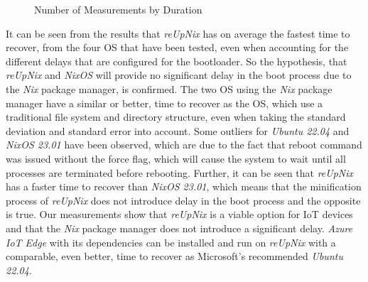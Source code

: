 \begin{figure}[H]
\caption{Number of Measurements by Duration}
\label{fig:timetorecover}
\end{figure}
\noindent
It can be seen from the results that \textit{reUpNix} has on average the fastest time
to recover, from the four \ac{OS} that have been tested, even when accounting for the different
delays that are configured for the bootloader. So the hypothesis, that \textit{reUpNix}
and \textit{NixOS} will provide no significant delay in the boot process due to
the \textit{Nix} package manager, is confirmed. The two \ac{OS} using the
\textit{Nix} package manager have a similar or better, time to recover as the \ac{OS},
which use a traditional file system and directory structure, even when taking
the standard deviation and standard error into account. Some outliers
for \textit{Ubuntu 22.04} and \textit{NixOS 23.01} have been observed, which are due to the
fact that reboot command was issued without the force flag, which will cause
the system to wait until all processes are terminated before rebooting. Further,
it can be seen that \textit{reUpNix} has a faster time to recover than \textit{NixOS 23.01},
which means that the minification process of \textit{reUpNix} does not introduce
delay in the boot process and the opposite is true.
Our measurements show that \textit{reUpNix} is a viable option for \ac{IoT} devices
and that the \textit{Nix} package manager does not introduce a significant delay.
\textit{Azure IoT Edge} with its dependencies can be installed and run on
\textit{reUpNix} with a comparable, even better, time to recover as Microsoft's
recommended \textit{Ubuntu 22.04}.


